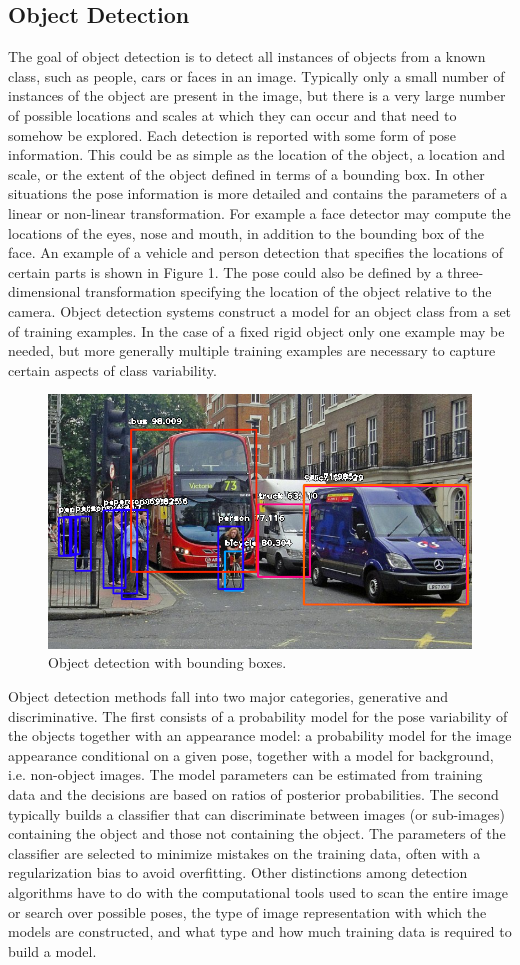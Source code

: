 \subsection{Object Detection}\label{s:patt-dtct}
The goal of object detection is to detect all instances of objects from a known
class, such as people, cars or faces in an image. Typically only a small number
of instances of the object are present in the image, but there is a very large
number of possible locations and scales at which they can occur and that need
to somehow be explored.
Each detection is reported with some form of pose information. This could
be as simple as the location of the object, a location and scale, or the extent
of the object defined in terms of a bounding box. In other situations the pose
information is more detailed and contains the parameters of a linear or non-linear
transformation. For example a face detector may compute the locations of the
eyes, nose and mouth, in addition to the bounding box of the face. An example
of a vehicle and person detection that specifies the locations of certain parts is shown in
Figure 1. The pose could also be defined by a three-dimensional transformation
specifying the location of the object relative to the camera.
Object detection systems construct a model for an object class from a set of
training examples. In the case of a fixed rigid object only one example may be
needed, but more generally multiple training examples are necessary to capture
certain aspects of class variability.
\begin{figure}[H]
	\centering
	\includegraphics[width=0.5\linewidth]{images/object_det.jpeg}
	\caption{Object detection with bounding boxes.}
\end{figure}

Object detection methods fall into two major categories, generative and discriminative. The first consists of a probability model for the pose variability of the objects together with an appearance model: a probability model for the image appearance conditional on a given pose, together with a model for background, i.e. non-object images. The model parameters can be estimated from training data and the decisions are based on ratios of posterior probabilities. The second typically builds a classifier that can discriminate between images (or sub-images) containing the object and those not containing the object. The parameters of the classifier are selected to minimize mistakes on the training data, often with a regularization bias to avoid overfitting. Other distinctions among detection algorithms have to do with the computational tools used to scan the entire image or search over possible poses, the type of image representation with which the models are constructed, and what type and how much training data is required to build a model.	

